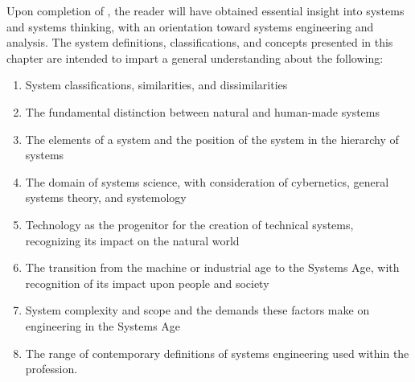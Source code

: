 Upon completion of , the reader will have obtained essential insight into systems and systems thinking, with an orientation toward systems engineering and analysis. The system definitions, classifications, and concepts presented in this chapter are intended to impart a general understanding about the following:

\begin{enumerate}
\item System classifications, similarities, and dissimilarities
\item The fundamental distinction between natural and human-made systems
\item The elements of a system and the position of the system in the hierarchy of systems
\item The domain of systems science, with consideration of cybernetics, general systems theory, and systemology
\item Technology as the progenitor for the creation of technical systems, recognizing its impact on the natural world
\item The transition from the machine or industrial age to the Systems Age, with recognition of its impact upon people and society
\item System complexity and scope and the demands these factors make on engineering in the Systems Age
\item The range of contemporary definitions of systems engineering used within the profession.
\end{enumerate}


